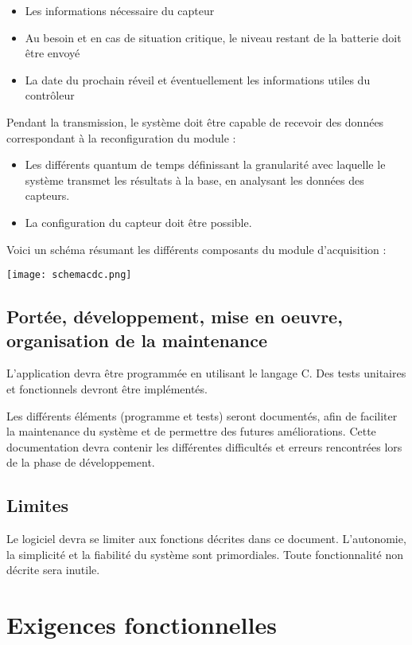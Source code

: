 \begin{itemize}
\item Les informations nécessaire du capteur
\item Au besoin et en cas de situation critique, le niveau restant de la batterie doit être envoyé
\item La date du prochain réveil et éventuellement les informations utiles du contrôleur
\end{itemize}

Pendant la transmission, le système doit être capable de recevoir des données correspondant à la reconfiguration du module :

\begin{itemize}
\item Les différents quantum de temps définissant la granularité avec laquelle le système transmet les résultats à la base, en analysant les données des capteurs.
\item La configuration du capteur doit être possible.
\end{itemize}

Voici un schéma résumant les différents composants du module d'acquisition :

\texttt{[image: schemacdc.png]}

\subsection{Portée, développement, mise en oeuvre, organisation de la maintenance}

L'application devra être programmée en utilisant le langage C. Des tests unitaires et fonctionnels devront être implémentés.

Les différents éléments (programme et tests) seront documentés, afin de faciliter la maintenance du système et de permettre des futures améliorations. Cette documentation devra contenir les différentes difficultés et erreurs rencontrées lors de la phase de développement.

\subsection{Limites}

Le logiciel devra se limiter aux fonctions décrites dans ce document. L'autonomie, la simplicité et la fiabilité du système sont primordiales. Toute fonctionnalité non décrite sera inutile.

\section{Exigences fonctionnelles}
